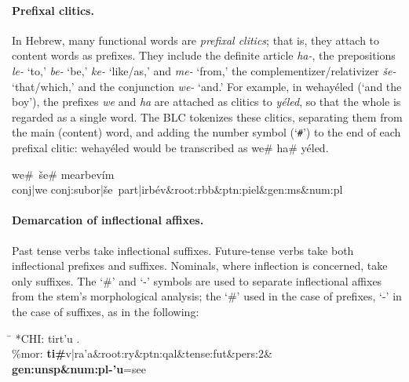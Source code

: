 \paragraph{Prefixal clitics.} In Hebrew, many functional words are \textit{prefixal clitics}; that is, they attach to content 
words as prefixes. They include the definite article \textit{ha-}, the prepositions \textit{le-} `to,' \textit{be-} `be,' 
\textit{ke-} `like/as,' and \textit{me-} `from,' the  complementizer/relativizer \textit{\v{s}e-} `that/which,' and the 
conjunction \textit{we-} `and.' For example,  in
\textsf{wehay\'eled} (`and the boy'), the prefixes \textit{we} and \textit{ha} are attached as clitics to \textit{y\'eled}, 
so that the whole is regarded as a single word. The BLC tokenizes these clitics, separating them from the main (content) 
word, and adding the number symbol (`\texttt{\#}') to the end of each prefixal clitic: \textsf{wehay\'eled} 
would be transcribed as \textsf{we\# ha\# y\'eled}.

\begin{exe}\label{ex:preclitics}
	\ex
	\textsf{we\#\, \v{s}e\# mearbev\'im} \\ %
	\textsf{conj|we conj:subor|\v{s}e\, part|irb\'ev\&root:rbb\&ptn:piel\&gen:ms\&num:pl} 
\end{exe}


\paragraph{Demarcation of inflectional affixes.}
Past tense verbs take inflectional suffixes. Future-tense verbs take both inflectional prefixes and suffixes. 
Nominals, where inflection
is concerned, take only suffixes. The `\#' and `-' symbols are used to separate inflectional
affixes from the stem's morphological analysis; the `\#' used in the case of prefixes, `-' in the
case of suffixes, as in the following:

\begin{exe}
\ex \begin{tabbing} \label{ex:pre:v:suf}
\hspace{0.6in} \= \hspace{5.5in} \kill
\textsf{*CHI:} \> \textsf{tirt\a'{u} .} \\
\textsf{\%mor:} \> \textbf{\textsf{ti}\#}\textsf{v|ra\a'{a}\&root:ry\&ptn:qal\&tense:fut\&pers:2\&
\textbf{gen:unsp\&num:pl-\a'{u}}=see}
\end{tabbing}
\end{exe}

